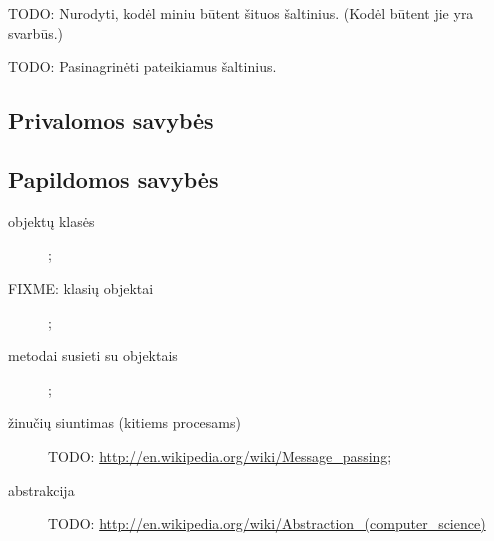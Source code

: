 TODO: Nurodyti, kodėl miniu būtent šituos šaltinius. (Kodėl būtent jie
yra svarbūs.)

TODO: Pasinagrinėti \cite[38]{Booch:2007:OAD:1407387} pateikiamus
šaltinius.

\subsection{Privalomos savybės}
\subsection{Papildomos savybės}

\begin{description}
  \item[objektų klasės] ;
  \item[FIXME: klasių objektai] ;
  \item[metodai susieti su objektais] ;
  \item[žinučių siuntimas (kitiems procesams)] 
    TODO: \url{http://en.wikipedia.org/wiki/Message_passing};
  \item[abstrakcija] 
    TODO: \url{http://en.wikipedia.org/wiki/Abstraction_(computer_science)}
\end{description}
